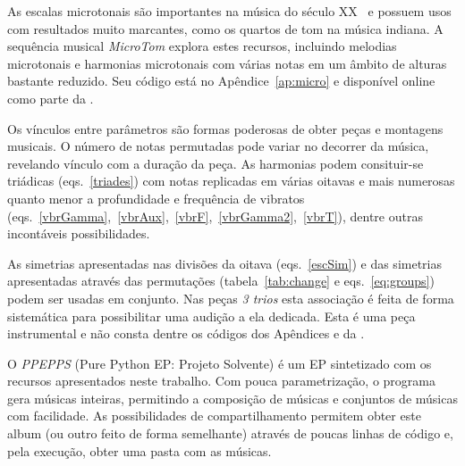 As escalas microtonais são importantes na música do século XX~\cite{microtonalidade} e possuem usos com resultados muito marcantes, como os quartos de tom na música indiana. A sequência musical \emph{MicroTom} explora estes recursos, incluindo melodias microtonais e harmonias microtonais com várias notas em um âmbito de alturas bastante reduzido. Seu código está no Apêndice~\ref{ap:micro} e disponível online como parte da \massa.

Os vínculos entre parâmetros são formas poderosas de obter peças e montagens musicais. O número de notas permutadas pode variar no decorrer da música, revelando vínculo com a duração da peça. As harmonias podem consituir-se triádicas (eqs.~\ref{triades}) com notas replicadas em várias oitavas e mais numerosas quanto menor a profundidade e frequência de vibratos (eqs.~\ref{vbrGamma},~\ref{vbrAux},~\ref{vbrF},~\ref{vbrGamma2},~\ref{vbrT}), dentre outras incontáveis possibilidades.

As simetrias apresentadas nas divisões da oitava (eqs.~\ref{escSim}) e das simetrias apresentadas através das permutações (tabela~\ref{tab:change} e eqs.~\ref{eq:groups}) podem ser usadas em conjunto. Nas peças \emph{3 trios} esta associação é feita de forma sistemática para possibilitar uma audição a ela dedicada. Esta é uma peça instrumental e não consta dentre os códigos dos Apêndices e da \massa.

O \emph{PPEPPS} (Pure Python EP: Projeto Solvente) é um EP sintetizado com os recursos apresentados neste trabalho. Com pouca parametrização, o programa gera músicas inteiras, permitindo a composição de músicas e conjuntos de músicas com facilidade. As possibilidades de compartilhamento permitem obter este album (ou outro feito de forma semelhante) através de poucas linhas de código e, pela execução, obter uma pasta com as músicas.


